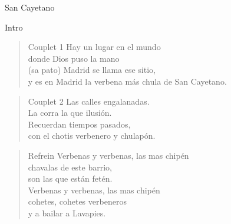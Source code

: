 \begin{song}{San Cayetano}
\begin{instrumental}{Intro}
   \measure{}
   \measure{}
   \hspace{3em} \measure{}
   
\end{instrumental}

\begin{verse}{Couplet 1}
Hay un lugar en el mundo\\
donde Dios puso la mano\\ \hspace{1em}(sa pato)
\chord{}Madrid se llama ese sitio,\\
y es en Madrid la verbena m\'{a}s chula de San Cayetano.\\
\end{verse}

\begin{verse}{Couplet 2}
Las calles engalanadas.\\
La corra la que ilusi\'{o}n.\\
Recuerdan tiempos pasados,\\
con el chotis verbenero y chulap\'{o}n.\hspace{1.75em}\\
\end{verse}

\begin{verse}{Refrein}
Verbenas y verbenas, las mas chip\'{e}n\\
\chord{}chavalas de este barrio,\\
son las que est\'{a}n fet\'{e}n.\\
Verbenas y verbenas, las mas chip\'{e}n\\
cohetes, cohetes verbeneros\\
y a bailar a Lavapies.\hspace{1.75em}\\
\end{verse}

\end{song}

